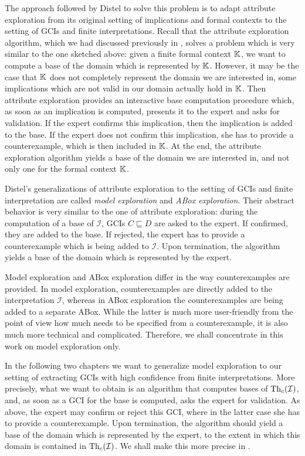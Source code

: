 The approach followed by Distel to solve this problem is to adapt attribute exploration
from its original setting of implications and formal contexts to the setting of GCIs and
finite interpretations.  Recall that the attribute exploration algorithm, which we had
discussed previously in , solves a problem which is very similar to
the one sketched above: given a finite formal context ${\mathbb{K}}$, we want to compute a base
of the domain which is represented by ${\mathbb{K}}$.  However, it may be the case that ${\mathbb{K}}$
does not completely represent the domain we are interested in, \ie some implications which
are not valid in our domain actually hold in ${\mathbb{K}}$.  Then attribute exploration
provides an interactive base computation procedure which, as soon as an implication is
computed, presents it to the expert and asks for validation.  If the expert confirms this
implication, then the implication is added to the base.  If the expert does not confirm
this implication, she has to provide a counterexample, which is then included in ${\mathbb{K}}$.
At the end, the attribute exploration algorithm yields a base of the domain we are
interested in, and not only one for the formal context ${\mathbb{K}}$.

Distel's generalizations of attribute exploration to the setting of GCIs and finite
interpretation are called \emph{model exploration} and \emph{ABox exploration}.  Their
abstract behavior is very similar to the one of attribute exploration: during the
computation of a base of $\mathcal{I}$, GCIs $C \sqsubseteq D$ are asked to the expert.
If confirmed, they are added to the base.  If rejected, the expert has to provide a
counterexample which is being added to $\mathcal{I}$.  Upon termination, the algorithm
yields a base of the domain which is represented by the expert.

Model exploration and ABox exploration differ in the way counterexamples are provided.  In
model exploration, counterexamples are directly added to the interpretation $\mathcal{I}$,
whereas in ABox exploration the counterexamples are being added to a separate ABox.  While
the latter is much more user-friendly from the point of view how much needs to be
specified from a counterexample, it is also much more technical and complicated.
Therefore, we shall concentrate in this work on model exploration only.

In the following two chapters we want to generalize model exploration to our setting of
extracting GCIs with high confidence from finite interpretations.  More precisely, what we
want to obtain is an algorithm that computes bases of $\operatorname{Th}_c(\mathcal{I})$, and, as soon
as a GCI for the base is computed, asks the expert for validation.  As above, the expert
may confirm or reject this GCI, where in the latter case she has to provide a
counterexample.  Upon termination, the algorithm should yield a base of the domain which
is represented by the expert, to the extent in which this domain is contained in
$\operatorname{Th}_c(\mathcal{I})$.  We shall make this more precise in .


